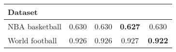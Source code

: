 \begin{tabular}{l SSSS}
  \toprule
  Dataset         &  &   &   &   \\
  \midrule
  NBA basketball  &         0.630 &         0.630 &  \bfseries 0.627 &           0.630 \\
  World football  &         0.926 &         0.926 &           0.927  & \bfseries 0.922 \\
  \bottomrule
\end{tabular}
